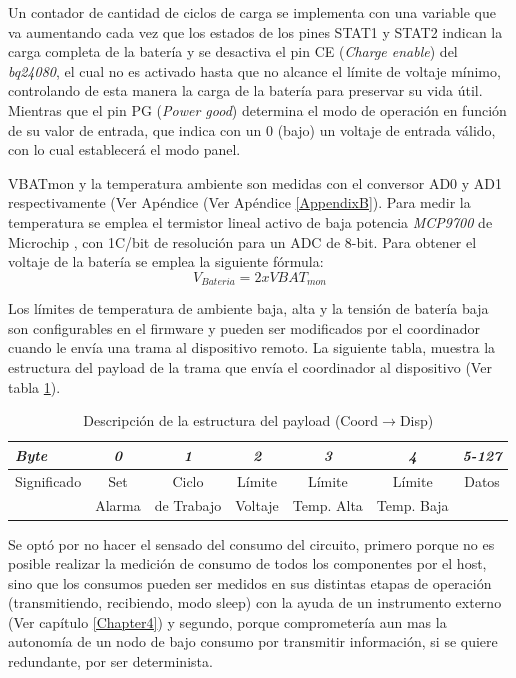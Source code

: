 {Un contador de cantidad de ciclos de carga se implementa con una variable que va aumentando cada vez que los estados de los pines STAT1 y STAT2 indican la carga completa de la batería y se desactiva el pin CE (\textit{Charge enable}) del \textit{bq24080}, el cual no es activado hasta que no alcance el límite de voltaje mínimo, controlando de esta manera la carga de la batería para preservar su vida útil. Mientras que el pin PG (\textit{Power good}) determina el modo de operación en función de su valor de entrada, que indica con un 0 (bajo) un voltaje de entrada válido, con lo cual establecerá el modo panel. 

VBATmon y la temperatura ambiente son medidas con el conversor AD0 y AD1 respectivamente (Ver Apéndice (Ver Apéndice \ref{AppendixB}). Para medir la temperatura se emplea el termistor lineal activo de baja potencia \textit{MCP9700} de Microchip \citep{termis}, con 1\grados C/bit de resolución para un ADC de 8-bit. Para obtener el voltaje de la batería se emplea la siguiente fórmula: \[V_{Bateria}=2xVBAT_{mon}\]

Los límites de temperatura de ambiente baja, alta y la tensión de batería baja son configurables en el firmware y pueden ser modificados por el coordinador cuando le envía una trama al dispositivo remoto. La siguiente tabla, muestra la estructura del payload de la trama que envía el coordinador al dispositivo (Ver tabla \ref{tab:coordisp}).

\begin{table}[ht]
	\centering
	\caption{Descripción de la estructura del payload (Coord$\rightarrow$Disp)}
	\begin{tabular}{@{} l *6c @{}}    \toprule
		\emph{\textbf{Byte}} & \emph{\textbf{0}} & \emph{\textbf{1}} & \emph{\textbf{2}} & \emph{\textbf{3}} & \emph{\textbf{4}} & \emph{\textbf{5-127}}\\
		\midrule
		Significado & Set & Ciclo & Límite & Límite & Límite & Datos\\
		 & Alarma & de Trabajo & Voltaje & Temp. Alta & Temp. Baja & \\
		\bottomrule
		\hline
	\end{tabular}
	\label{tab:coordisp}
\end{table}

Se optó por no hacer el sensado del consumo del circuito, primero porque no es posible realizar la medición de consumo de todos los componentes por el host, sino que los consumos pueden ser medidos en sus distintas etapas de operación (transmitiendo, recibiendo, modo sleep) con la ayuda de un instrumento externo (Ver capítulo \ref{Chapter4}) y segundo, porque comprometería aun mas la autonomía de un nodo de bajo consumo por transmitir información, si se quiere redundante, por ser determinista.

}
